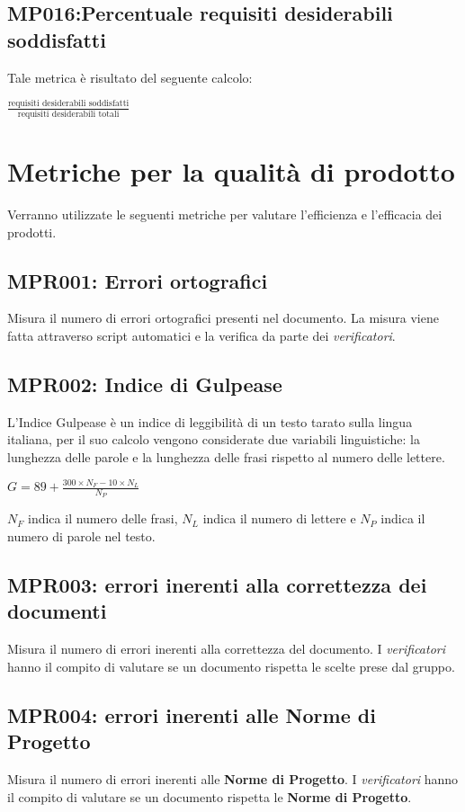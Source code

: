 \subsection{MP016:Percentuale requisiti desiderabili soddisfatti}
Tale metrica è risultato del seguente calcolo:
\begin{center}
$\frac{\mbox{requisiti desiderabili soddisfatti}}{\mbox{requisiti desiderabili totali}}$
\end{center}

\section{Metriche per la qualità di prodotto}\label{metriche}
Verranno utilizzate le seguenti metriche per valutare l'efficienza e l'efficacia dei
prodotti.
\subsection{MPR001: Errori ortografici}
Misura il numero di errori ortografici presenti nel documento. La misura viene fatta attraverso script automatici e la verifica da parte dei \textit{verificatori}.

\subsection{MPR002: Indice di Gulpease}
L’Indice Gulpease è un indice di leggibilità di un testo tarato sulla lingua italiana, per il suo calcolo vengono considerate due variabili linguistiche: la lunghezza delle parole e la lunghezza delle frasi rispetto al numero delle lettere.
\begin{center}{$G=89+\frac{300\times N_F-10\times N_L}{N_P}$}\end{center}
$N_F$ indica il numero delle frasi, $N_L$ indica il numero di lettere e $N_P$ indica il numero di parole nel testo.

\subsection{MPR003: errori inerenti alla correttezza dei documenti}
Misura il numero di errori inerenti alla correttezza del documento. I \textit{verificatori} hanno il compito di valutare se un documento rispetta le scelte prese dal gruppo.

\subsection{MPR004: errori inerenti alle Norme di Progetto}
Misura il numero di errori inerenti alle \textbf{Norme di Progetto}. I \textit{verificatori} hanno il compito di valutare se un documento rispetta le \textbf{Norme di Progetto}.


